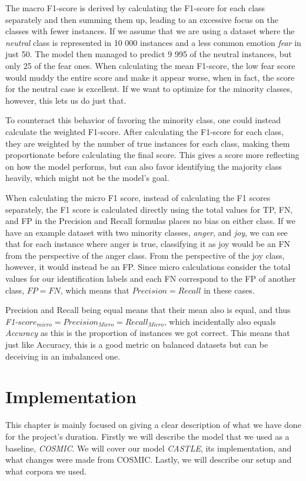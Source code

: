 \documentclass[nofilelist]{cslthse-msc}
\begin{document}
The macro F1-score is derived by calculating the F1-score for each class separately and then summing them up, leading to an excessive focus on the classes with fewer instances. If we assume that we are using a dataset where the \textit{neutral} class is represented in 10 000 instances and a less common emotion \textit{fear} in just 50. The model then managed to predict 9 995 of the neutral instances, but only 25 of the fear ones. When calculating the mean F1-score, the low fear score would muddy the entire score and make it appear worse, when in fact, the score for the neutral case is excellent. If we want to optimize for the minority classes, however, this lets us do just that. 

To counteract this behavior of favoring the minority class, one could instead calculate the weighted F1-score. After calculating the F1-score for each class, they are weighted by the number of true instances for each class, making them proportionate before calculating the final score. This gives a score more reflecting on how the model performs, but can also favor identifying the majority class heavily, which might not be the model's goal.

When calculating the micro F1 score, instead of calculating the F1 scores separately, the F1 score is calculated directly using the total values for TP, FN, and FP in the Precision and Recall formulas places no bias on either class. If we have an example dataset with two minority classes, \textit{anger}, and \textit{joy}, we can see that for each instance where anger is true, classifying it as joy would be an FN from the perspective of the anger class. From the perspective of the joy class, however, it would instead be an FP. Since micro calculations consider the total values for our identification labels and each FN correspond to the FP of another class, $FP = FN$, which means that $Precision = Recall$ in these cases. 

Precision and Recall being equal means that their mean also is equal, and thus \textit{F1-}$score_{micro} = Precision_{Micro} = Recall_{Micro}$, which incidentally also equals \textit{Accuracy} as this is the proportion of instances we got correct. This means that just like Accuracy, this is a good metric on balanced datasets but can be deceiving in an imbalanced one.







\chapter{Implementation}
This chapter is mainly focused on giving a clear description of what we have done for the project's duration. Firstly we will describe the model that we used as a baseline, \textit{COSMIC}. We will cover our model \textit{CASTLE}, its implementation, and what changes were made from COSMIC. Lastly, we will describe our setup and what corpora we used. 
\end{document}
